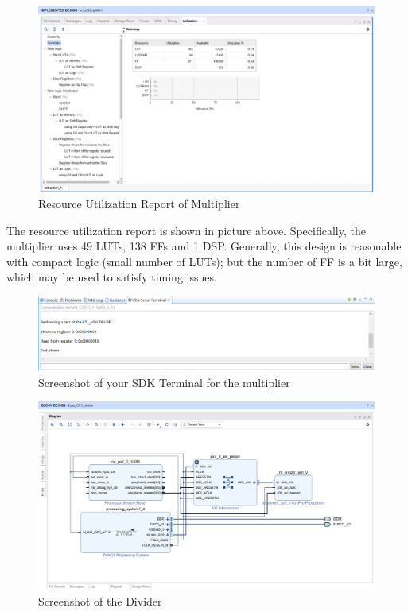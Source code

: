 \documentclass[a4paper]{article}
\begin{document}
\begin{figure}[H]
    \centering
    \includegraphics[width=14cm]{6_new.png}
    \caption{Resource Utilization Report of Multiplier}
    \label{fig:6}
\end{figure}
The resource utilization report is shown in picture above. Specifically, the multiplier uses 49 LUTs, 138 FFs and 1 DSP. Generally, this design is reasonable with compact logic (small number of LUTs); but the number of FF is a bit large, which may be used to satisfy timing issues. 

\begin{figure}[H]
    \centering
    \includegraphics[width=14cm]{7_new.png}
    \caption{Screenshot of your SDK Terminal for the multiplier}
    \label{fig:7}
\end{figure}

\begin{figure}[H]
    \centering
    \includegraphics[width=14cm]{8}
    \caption{Screenshot of the Divider}
    \label{fig:8}
\end{figure}
\end{document}
